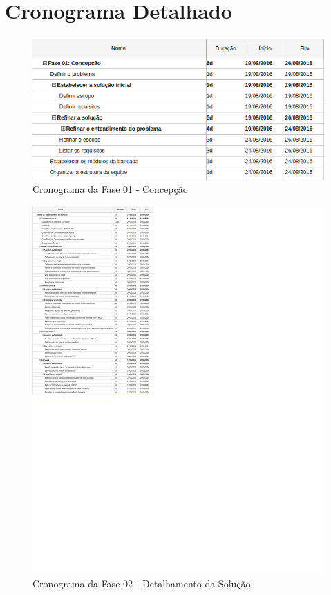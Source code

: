

\chapter{Cronograma Detalhado}
	\label{cronograma_detalhado}
%     


\begin{figure}[!ht]
\centering
\includegraphics[scale=1]{figuras/cronograma_fase01.png}
\caption{Cronograma da Fase 01 - Concepção}
\end{figure}

\begin{figure}[!ht]
\centering
\includegraphics[scale=0.75]{figuras/cronograma_fase02.png}
\caption{Cronograma da Fase 02 - Detalhamento da Solução}
\end{figure}

